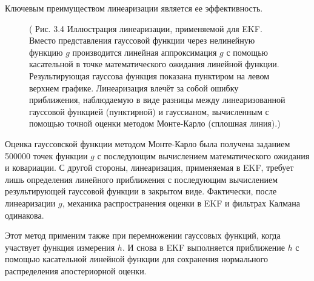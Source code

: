\documentclass[10pt,a4paper]{article}
\begin{document}
Ключевым преимуществом линеаризации является ее эффективность.    

\begin{figure}[H]
	\caption{ (  Рис. 3.4 Иллюстрация линеаризации, применяемой для EKF. Вместо представления гауссовой функции через нелинейную функцию $g$ производится линейная аппроксимация $g$ с помощью касательной в точке математического ожидания линейной функции. Результирующая гауссова функция показана пунктиром на левом верхнем графике. Линеаризация влечёт за собой ошибку приближения, наблюдаемую в виде разницы между линеаризованной гауссовой функцией (пунктирной) и гауссианом, вычисленным с помощью точной оценки методом Монте-Карло (сплошная линия).)}
	\label{fig:34orig}
\end{figure} 
	
Оценка гауссовской функции методом Монте-Карло была получена заданием 500000 точек функции $g$ с последующим вычислением математического ожидания и ковариации. С другой стороны, линеаризация, применяемая в EKF, требует лишь определения линейного приближения с последующим вычислением результирующей гауссовой функции в закрытом виде. Фактически, после линеаризации $g$, механика распространения оценки в EKF и фильтрах Калмана одинакова.

Этот метод применим также при перемножении гауссовых функций, когда участвует функция измерения $h$. И снова в EKF выполняется приближение $h$ с помощью касательной линейной функции для сохранения нормального распределения апостериорной оценки.
\end{document}
